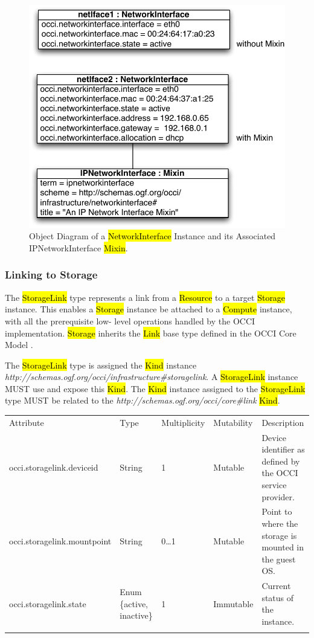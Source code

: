 \documentclass[10pt,a4paper]{article}
\begin{document}
\begin{figure}[!h]
	\centering
	\includegraphics[scale=0.5]{figs/infrastructure_mixins_obj_dia2_networkinterface}
	\caption{Object Diagram of a \hl{NetworkInterface} Instance and its Associated 
	IPNetworkInterface \hl{Mixin}.}
	\label{fig:networkinterface_mixin}
\end{figure}

\subsubsection{Linking to Storage}
The \hl{StorageLink} type represents a link from a \hl{Resource} to a target \hl{Storage} instance. This 
enables a \hl{Storage} instance be attached to a \hl{Compute} instance, with all the prerequisite low-
level operations handled by the OCCI implementation.
%
\hl{Storage} inherits the \hl{Link} base type defined in the OCCI Core Model
\cite{occi:core}.

The \hl{StorageLink} type is assigned the \hl{Kind} instance 
\textit{http://schemas.ogf.org/occi/infrastructure\#storagelink}.
A \hl{StorageLink} instance MUST use and expose this \hl{Kind}. 
%
The \hl{Kind} instance assigned to the \hl{StorageLink} type MUST be related to
the \textit{http://schemas.ogf.org/occi/core\#link} \hl{Kind}.

{
	\begin{tabular}{lp{1.8cm}p{1cm}lp{5cm}}
	\toprule
	Attribute&Type&Multi\-plicity&Mutability&Description\\
	\colrule
	occi.storagelink.deviceid & String & 1 & Mutable 
	& Device identifier as defined by the OCCI service provider.\\
	occi.storagelink.mountpoint & String & 0\ldots1 & Mutable 
	& Point to where the storage is mounted in the guest OS.\\
	occi.storagelink.state & Enum \{active, inactive\}& 1 
	& Immutable & Current status of the instance.\\
	\botrule
	\end{tabular}
}
\end{document}
